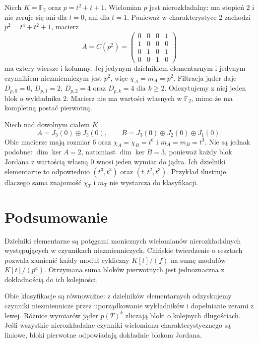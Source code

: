 \begin{przyklad}
\label{prz:lin20-finite}
Niech \(K=\mathbb F_2\) oraz
\(p=t^2+t+1\).
Wielomian \(p\) jest nierozkładalny:
ma stopień \(2\) i nie zeruje się
ani dla \(t=0\), ani dla \(t=1\).
Ponieważ w charakterystyce \(2\)
zachodzi \(p^2=t^4+t^2+1\),
macierz
\[
 A=C(p^2)=
 \begin{pmatrix}
 0&0&0&1\\
 1&0&0&0\\
 0&1&0&1\\
 0&0&1&0
 \end{pmatrix}
\]
ma cztery wiersze i kolumny.
Jej jedynym dzielnikiem elementarnym
i jedynym czynnikiem niezmienniczym
jest \(p^2\), więc
\(\chi_A=m_A=p^2\).
Filtracja jąder daje
\(D_{p,0}=0\), \(D_{p,1}=2\),
\(D_{p,2}=4\) oraz
\(D_{p,k}=4\) dla \(k\ge2\).
Odczytujemy z niej jeden blok
o wykładniku \(2\).
Macierz nie ma wartości własnych
w \(\mathbb F_2\), mimo że
ma kompletną postać pierwotną.
\end{przyklad}

\begin{przyklad}
\label{prz:lin20-not-enough}
Niech nad dowolnym ciałem \(K\)
\[
 A=J_3(0)\oplus J_3(0),\qquad
 B=J_3(0)\oplus J_2(0)\oplus J_1(0).
\]
Obie macierze mają rozmiar \(6\)
oraz \(\chi_A=\chi_B=t^6\) i
\(m_A=m_B=t^3\).
Nie są jednak podobne:
\(\dim\ker A=2\), natomiast
\(\dim\ker B=3\), ponieważ
każdy blok Jordana z wartością
własną \(0\) wnosi jeden wymiar
do jądra. Ich dzielniki elementarne
to odpowiednio \((t^3,t^3)\)
oraz \((t,t^2,t^3)\).
Przykład ilustruje, dlaczego
sama znajomość \(\chi_T\) i \(m_T\)
nie wystarcza do klasyfikacji.
\end{przyklad}

\section{Podsumowanie}
\label{sec:lin20-summary}

Dzielniki elementarne są potęgami monicznych
wielomianów nierozkładalnych
występujących w czynnikach niezmienniczych.
Chińskie twierdzenie o resztach
pozwala zamienić każdy moduł cykliczny
\(K[t]/(f)\) na sumę modułów
\(K[t]/(p^a)\).
Otrzymana suma bloków pierwotnych
jest jednoznaczna z dokładnością
do ich kolejności.

Obie klasyfikacje są równoważne:
z dzielników elementarnych odzyskujemy
czynniki niezmiennicze przez uporządkowanie
wykładników i dopełnianie zerami z lewej.
Różnice wymiarów jąder \(p(T)^k\)
zliczają bloki o kolejnych długościach.
Jeśli wszystkie nierozkładalne czynniki
wielomianu charakterystycznego są liniowe,
bloki pierwotne odpowiadają
dokładnie blokom Jordana.
